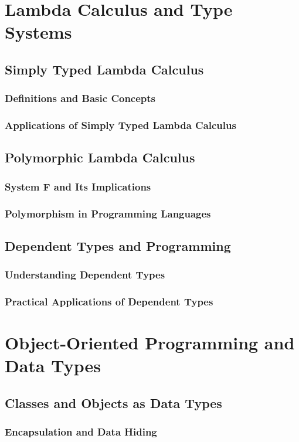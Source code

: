 \documentclass[12pt, oneside]{book}
\begin{document}
\section{Lambda Calculus and Type Systems}
\subsection{Simply Typed Lambda Calculus}
\subsubsection{Definitions and Basic Concepts}
\subsubsection{Applications of Simply Typed Lambda Calculus}
\subsection{Polymorphic Lambda Calculus}
\subsubsection{System F and Its Implications}
\subsubsection{Polymorphism in Programming Languages}
\subsection{Dependent Types and Programming}
\subsubsection{Understanding Dependent Types}
\subsubsection{Practical Applications of Dependent Types}

\section{Object-Oriented Programming and Data Types}
\subsection{Classes and Objects as Data Types}
\subsubsection{Encapsulation and Data Hiding}
\end{document}

